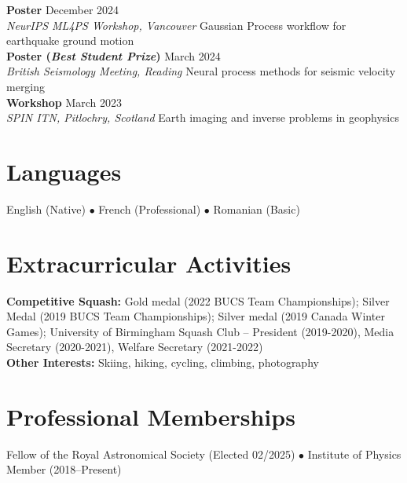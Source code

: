 \documentclass[11pt,a4paper]{article}
\newcommand{\cventry}[4]{%
    \noindent\textbf{#1} \hfill #2\\
    \textit{#3} \hfill #4\\[0.3em]
}
\begin{document}
\cventry{Poster}{December 2024}{NeurIPS ML4PS Workshop, Vancouver}{Gaussian Process workflow for earthquake ground motion}

\cventry{Poster (\textit{Best Student Prize})}{March 2024}{British Seismology Meeting, Reading}{Neural process methods for seismic velocity merging}

\cventry{Workshop}{March 2023}{SPIN ITN, Pitlochry, Scotland}{Earth imaging and inverse problems in geophysics}

\section*{Languages}
\par\noindent\hspace{1.5em}%
\begin{minipage}[t]{\dimexpr\textwidth-1.5em\relax}
English (Native) $\bullet$ French (Professional) $\bullet$ Romanian (Basic)
\end{minipage}\par
\vspace{0.5em}

\section*{Extracurricular Activities}
\par\noindent\hspace{1.5em}%
\begin{minipage}[t]{\dimexpr\textwidth-1.5em\relax}
\textbf{Competitive Squash:} Gold medal (2022 BUCS Team Championships); Silver Medal (2019 BUCS Team Championships); Silver medal (2019 Canada Winter Games); University of Birmingham Squash Club -- President (2019-2020), Media Secretary (2020-2021), Welfare Secretary (2021-2022) \\

\noindent\textbf{Other Interests:} Skiing, hiking, cycling, climbing, photography
\end{minipage}\par
\vspace{0.5em}

\section*{Professional Memberships}
\par\noindent\hspace{1.5em}%
\begin{minipage}[t]{\dimexpr\textwidth-1.5em\relax}
Fellow of the Royal Astronomical Society (Elected 02/2025) $\bullet$ Institute of Physics Member (2018--Present)
\end{minipage}\par
\vspace{0.5em}

\label{LastPage}
\end{document}

